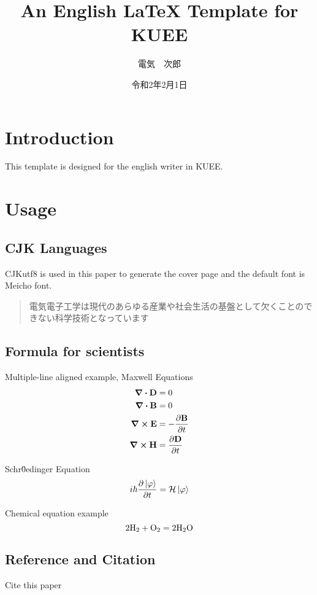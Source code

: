 \documentclass{kuee_en}
\title{An English \LaTeX{} Template for KUEE}
\author{{電気　次郎}} %
\date{{令和2年2月1日}}
\begin{document}
\maketitle

\begin{abstract}
    \lipsum[1]
\end{abstract}

\tableofcontents

\chapter{Introduction}
This template is designed for the english writer in KUEE.

\lipsum[3-7]

\chapter{Usage}

\section{CJK Languages}

CJKutf8 is used in this paper to generate the cover page and the default font is Meicho font.


\begin{quote}
電気電子工学は現代のあらゆる産業や社会生活の基盤として欠くことのできない科学技術となっています
\end{quote}

\section{Formula for scientists}

Multiple-line aligned example, Maxwell Equations
\begin{align*}
    \div{\vb{D}} &= 0 \\
    \div{\vb{B}} &= 0 \\
    \curl{\vb{E}} &= -\pdv{\vb{B}}{t} \\
    \curl{\vb{H}} &= \pdv{\vb{D}}{t}
\end{align*}

Schr\"{0}edinger Equation
$$
    i\hbar \pdv{\ket{\varphi}}{t} = \mathcal{H} \ket{\varphi}
$$

Chemical equation example
$$
    2\ce{H2}+\ce{O2} = 2\ce{H2O}
$$

\section{Reference and Citation}
Cite this paper
\cite{Yang2007}
\end{document}
